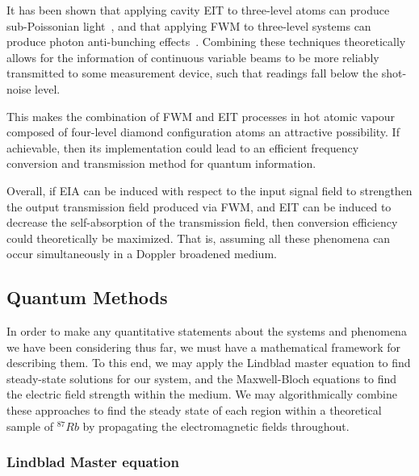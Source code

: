 \documentclass[aps,pra,showpacs,amsmath,amssymb,nofootinbib,longbibliography,superscriptaddress
]{revtex4-1}
\theoremstyle{definition}
\theoremstyle{remark}
\newcommand{\0}{\hat{0}}
\begin{document}
It has been shown that applying cavity EIT to three-level atoms can produce sub-Poissonian light~\cite{Souza}, and that applying FWM to three-level systems can produce photon anti-bunching effects~\cite{FWM}. Combining these techniques theoretically allows for the information of continuous variable beams to be more reliably transmitted to some measurement device, such that readings fall below the shot-noise level.

This makes the combination of FWM and EIT processes in hot atomic vapour composed of four-level diamond configuration atoms an attractive possibility. If achievable, then its implementation could lead to an efficient frequency conversion and transmission method for quantum information.

Overall, if EIA can be induced with respect to the input signal field to strengthen the output transmission field produced via FWM, and EIT can be induced to decrease the self-absorption of the transmission field, then conversion efficiency could theoretically be maximized. That is, assuming all these phenomena can occur simultaneously in a Doppler broadened medium.



\subsection{Quantum Methods}

In order to make any quantitative statements about the systems and phenomena we have been considering thus far, we must have a mathematical framework for describing them. To this end, we may apply the Lindblad master equation to find steady-state solutions for our system, and the Maxwell-Bloch equations to find the electric field strength within the medium. We may algorithmically combine these approaches to find the steady state of each region within a theoretical sample of $^{87}Rb$ by propagating the electromagnetic fields throughout.

\subsubsection{Lindblad Master equation}
\end{document}
